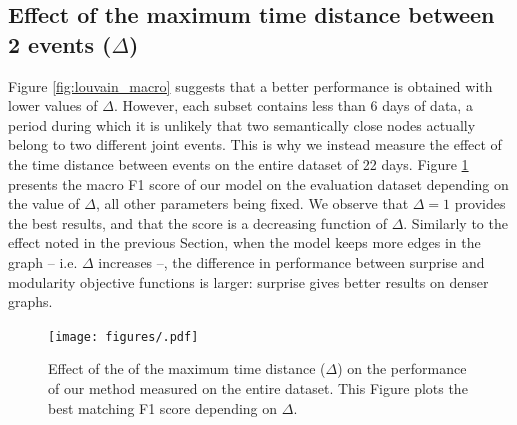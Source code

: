 \subsection{Effect of the maximum time distance between 2 events ($\Delta$)}

Figure \ref{fig:louvain_macro} suggests that a better performance is obtained with lower values of $\Delta$. However, each subset contains less than 6 days of data, a period during which it is unlikely that two semantically close nodes actually belong to two different joint events. This is why we instead measure the effect of the time distance between events on the entire dataset of 22 days. Figure \ref{fig:louvain_macro_days} presents the macro F1 score of our model on the evaluation dataset depending on the value of $\Delta$, all other parameters being fixed. We observe that $\Delta=1$ provides the best results, and that the score is a decreasing function of $\Delta$. Similarly to the effect noted in the previous Section, when the model keeps more edges in the graph -- i.e. $\Delta$ increases --, the difference in performance between surprise and modularity objective functions is larger: surprise gives better results on denser graphs.

\begin{figure}
    \centering
    \texttt{[image: figures/.pdf]}
    \caption[Effect of the of the maximum time distance on the performance of our method]{Effect of the of the maximum time distance ($\Delta$) on the performance of our method measured on the entire dataset. This Figure plots the best matching F1 score depending on $\Delta$.}
    \label{fig:louvain_macro_days}
\end{figure}
